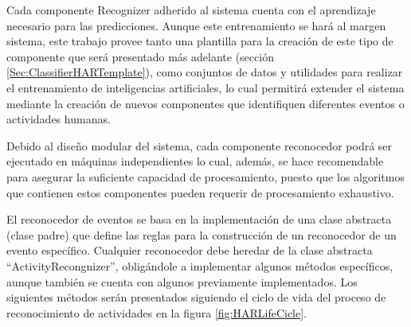         Cada componente Recognizer adherido al sistema cuenta con el aprendizaje necesario para las predicciones. Aunque este entrenamiento se hará al margen sistema, este trabajo provee tanto una plantilla para la creación de este tipo de componente que será presentado más adelante (sección \ref{Sec:ClassifierHARTemplate}), como conjuntos de datos y utilidades para realizar el entrenamiento de inteligencias artificiales, lo cual permitirá extender el sistema mediante la creación de nuevos componentes que identifiquen diferentes eventos o actividades humanas.
        
        Debido al diseño modular del sistema, cada componente reconocedor podrá ser ejecutado en máquinas independientes lo cual, además, se hace recomendable para asegurar la suficiente capacidad de procesamiento, puesto que los algoritmos que contienen estos componentes pueden requerir de procesamiento exhaustivo.
        
        El reconocedor de eventos se basa en la implementación de una clase abstracta (clase padre) que define las reglas para la construcción de un reconocedor de un evento específico. Cualquier reconocedor debe heredar de la clase abstracta ``ActivityRecongnizer'', obligándole a implementar algunos métodos específicos, aunque también se cuenta con algunos previamente implementados. Los siguientes métodos serán presentados siguiendo el ciclo de vida del proceso de reconocimiento de actividades en la figura \ref{fig:HARLifeCicle}. 
        
